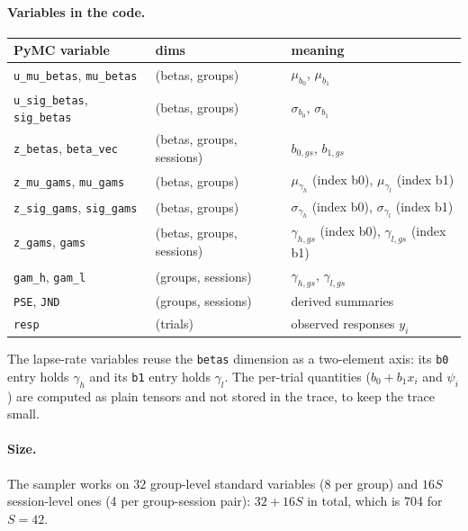 \documentclass[11pt]{article}
\newcommand{\code}[1]{\texttt{#1}}
\begin{document}
\paragraph{Variables in the code.}
\begin{center}
\begin{tabular}{lll}
\toprule
PyMC variable & dims & meaning \\
\midrule
\code{u\_mu\_betas}, \code{mu\_betas} & (betas, groups) & $\mu_{b_0}$, $\mu_{b_1}$ \\
\code{u\_sig\_betas}, \code{sig\_betas} & (betas, groups) & $\sigma_{b_0}$, $\sigma_{b_1}$ \\
\code{z\_betas}, \code{beta\_vec} & (betas, groups, sessions) & $b_{0,gs}$, $b_{1,gs}$ \\
\code{z\_mu\_gams}, \code{mu\_gams} & (betas, groups) & $\mu_{\gamma_h}$ (index b0), $\mu_{\gamma_l}$ (index b1) \\
\code{z\_sig\_gams}, \code{sig\_gams} & (betas, groups) & $\sigma_{\gamma_h}$ (index b0), $\sigma_{\gamma_l}$ (index b1) \\
\code{z\_gams}, \code{gams} & (betas, groups, sessions) & $\gamma_{h,gs}$ (index b0), $\gamma_{l,gs}$ (index b1) \\
\code{gam\_h}, \code{gam\_l} & (groups, sessions) & $\gamma_{h,gs}$, $\gamma_{l,gs}$ \\
\code{PSE}, \code{JND} & (groups, sessions) & derived summaries \\
\code{resp} & (trials) & observed responses $y_i$ \\
\bottomrule
\end{tabular}
\end{center}
The lapse-rate variables reuse the \code{betas} dimension as a two-element axis:
its \code{b0} entry holds $\gamma_h$ and its \code{b1} entry holds $\gamma_l$.
The per-trial quantities ($b_0+b_1x_i$ and $\psi_i$) are computed as plain
tensors and not stored in the trace, to keep the trace small.

\paragraph{Size.} The sampler works on $32$ group-level standard variables
(8 per group) and $16S$ session-level ones (4 per group-session pair):
$32 + 16S$ in total, which is 704 for $S=42$.
\end{document}
